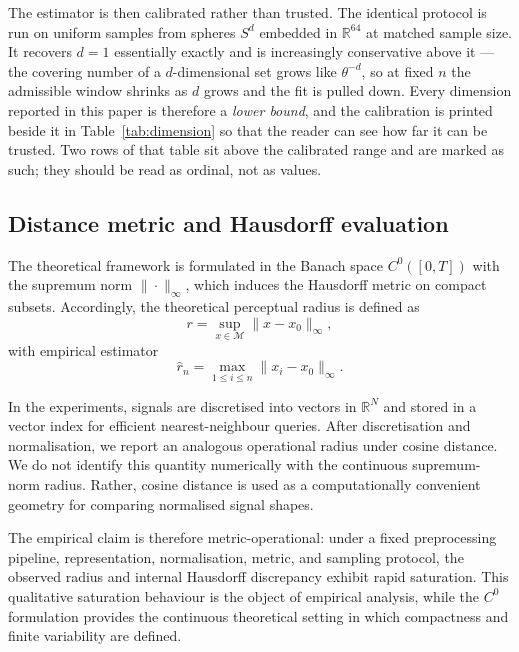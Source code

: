 \documentclass[10pt]{article}
\theoremstyle{plain}
\theoremstyle{definition}
\theoremstyle{remark}
\begin{document}
The estimator is then calibrated rather than trusted. The identical protocol is
run on uniform samples from spheres $S^d$ embedded in $\mathbb{R}^{64}$ at
matched sample size. It recovers $d=1$ essentially exactly and is increasingly
conservative above it --- the covering number of a $d$-dimensional set grows
like $\theta^{-d}$, so at fixed $n$ the admissible window shrinks as $d$ grows
and the fit is pulled down. Every dimension reported in this paper is therefore
a \emph{lower bound}, and the calibration is printed beside it in
Table~\ref{tab:dimension} so that the reader can see how far it can be trusted.
Two rows of that table sit above the calibrated range and are marked as such;
they should be read as ordinal, not as values.

\subsection{Distance metric and Hausdorff evaluation}

The theoretical framework is formulated in the Banach space $C^0([0,T])$ with 
the supremum norm $\|\cdot\|_\infty$, which induces the Hausdorff metric on 
compact subsets. Accordingly, the theoretical perceptual radius is defined as
\[
r = \sup_{x \in \mathcal{M}} \|x - x_0\|_\infty,
\]
with empirical estimator
\[
\hat{r}_n = \max_{1 \le i \le n} \|x_i - x_0\|_\infty.
\]

In the experiments, signals are discretised into vectors in $\mathbb{R}^N$ and
stored in a vector index for efficient nearest-neighbour queries. After
discretisation and normalisation, we report an analogous operational radius
under cosine distance. We do not identify this quantity numerically with the
continuous supremum-norm radius. Rather, cosine distance is used as a
computationally convenient geometry for comparing normalised signal shapes.

The empirical claim is therefore metric-operational: under a fixed
preprocessing pipeline, representation, normalisation, metric, and sampling
protocol, the observed radius and internal Hausdorff discrepancy exhibit rapid
saturation. This qualitative saturation behaviour is the object of empirical
analysis, while the $C^0$ formulation provides the continuous theoretical
setting in which compactness and finite variability are defined.
\end{document}
